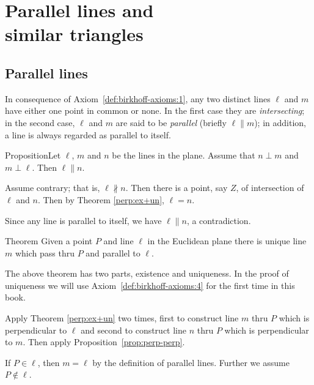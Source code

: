\chapter[Parallel lines and similar triangles]{Parallel lines and\\ similar triangles}\label{chap:parallel}

\section*{Parallel lines}

In consequence of Axiom~\ref{def:birkhoff-axioms:1}, 
any two distinct lines $\ell$ and $m$ have either one point
in common or none. 
In the first case they are \emph{intersecting}; 
in the second case, $\ell$ and $m$ are said to be \emph{parallel} (briefly $\ell\parallel m$);
in addition, a line is always regarded as parallel to itself.


\begin{thm}{Proposition}\label{prop:perp-perp}Let $\ell$, $m$ and $n$ be the lines in the plane.
Assume that $n\perp m$ and $m\perp \ell$.
Then $\ell\parallel n$. 
\end{thm}

Assume contrary; 
that is, $\ell\nparallel n$.
Then there is a point, say $Z$, of intersection of $\ell$ and $n$.
Then by Theorem \ref{perp:ex+un},
$\ell=n$.

Since any line is parallel to itself, we have $\ell\parallel n$, a contradiction.
\qeds

\begin{thm}{Theorem}\label{thm:parallel}
Given a point $P$ and line $\ell$ in the Euclidean plane
there is unique line $m$
which pass thru $P$ and parallel to $\ell$.
\end{thm}

The above theorem has two parts, existence and uniqueness.
In the proof of uniqueness we will use Axiom~\ref{def:birkhoff-axioms:4} for the first time in this book.

Apply Theorem \ref{perp:ex+un} two times,
first to construct line $m$ thru $P$ which is perpendicular to $\ell$
and second to construct line $n$ thru $P$ which is perpendicular to $m$.
Then apply Proposition~\ref{prop:perp-perp}.

If $P\in\ell$, then $m=\ell$ by the definition of parallel lines.
Further we assume $P\notin\ell$.

